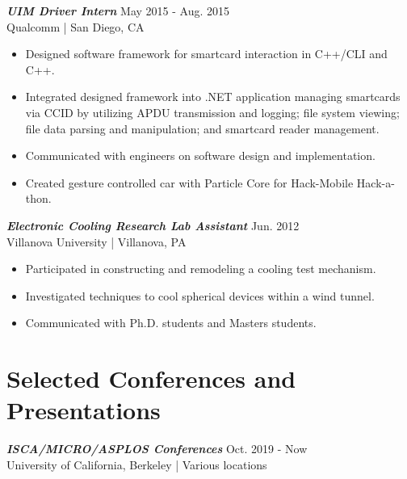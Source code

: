 \documentclass[letter]{res}
\begin{document}
\begin{resume}
\vspace{-2mm}

{\sl \textbf{UIM Driver Intern}} \hfill May 2015 - Aug. 2015\\
Qualcomm | San Diego, CA \newline

 \vspace{-4mm}

 \begin{itemize}
 \item Designed software framework for smartcard interaction in C++/CLI and C++.
 \item Integrated designed framework into .NET application managing smartcards via CCID by utilizing APDU transmission and logging; file system viewing; file data parsing and manipulation; and smartcard reader management.
 \item Communicated with engineers on software design and implementation.
 \item Created gesture controlled car with Particle Core for Hack-Mobile Hack-a-thon.
 \end{itemize}

\vspace{-2mm}

{\sl \textbf{Electronic Cooling Research Lab Assistant}} \hfill Jun. 2012\\
Villanova University | Villanova, PA \newline

 \vspace{-4mm}

 \begin{itemize}
 \item Participated in constructing and remodeling a cooling test mechanism.
 \item Investigated techniques to cool spherical devices within a wind tunnel.
 \item Communicated with Ph.D. students and Masters students.
 \end{itemize}

\vspace{-4mm}

\section{Selected Conferences and Presentations}

{\sl \textbf{ISCA/MICRO/ASPLOS Conferences}} \hfill Oct. 2019 - Now\\
 University of California, Berkeley | Various locations \newline


\end{resume}
\end{document}
